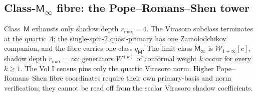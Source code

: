 \subsection{Class-$\mathsf M_\infty$ fibre: the Pope--Romans--Shen tower}
\label{sec:hdm-class-m-infty-fibre}

Class~$\mathsf M$ exhausts only shadow depth $r_{\max}=4$. The
Virasoro subclass terminates at the quartic $\Lambda$; the
single-spin-$2$ quasi-primary has one Zamolodchikov companion, and
the fibre carries one class $q_\mathsf M$. The limit class
$\mathsf M_\infty$ is $\mathcal W_{1+\infty}[c]$, shadow depth
$r_{\max}=\infty$: generators $W^{(k)}$ of conformal weight $k$ occur
for every $k \geq 1$. The Vol I census pins only the quartic Virasoro
norm. Higher Pope--Romans--Shen fibre coordinates require their own
primary-basis and norm verification; they cannot be read off from the
scalar Virasoro shadow coefficients.

